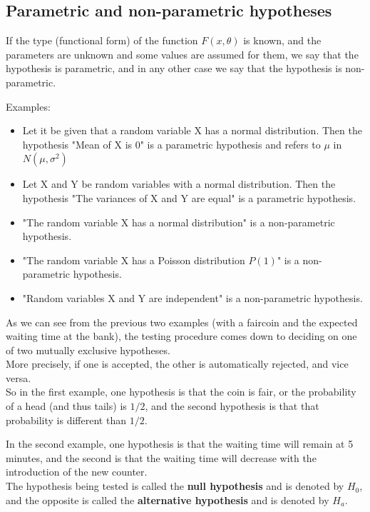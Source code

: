 \documentclass[a4paper, 12pt]{article}
\begin{document}
\subsection{Parametric and non-parametric hypotheses}

If the type (functional form) of the function $F(x,\theta)$ is known, and the parameters are unknown and some values are assumed for them, we say that the hypothesis is parametric, and in any other case we say that the hypothesis is non-parametric.

Examples:

\begin{itemize}
  \item  Let it be given that a random variable X has a normal distribution. Then the
  hypothesis "Mean of X is 0" is a parametric hypothesis and refers to $\mu$ in $N(\mu, \sigma^2)$
  \item Let X and Y be random variables with a normal distribution. Then the
  hypothesis "The variances of X and Y are equal" is a parametric hypothesis.
  \item  "The random variable X has a normal distribution" is a non-parametric
  hypothesis.
  \item  "The random variable X has a Poisson distribution $P(1)$" is a non-parametric
  hypothesis.
  \item  "Random variables X and Y are independent" is a non-parametric hypothesis.
\end{itemize}

As we can see from the previous two examples (with a faircoin and the expected waiting time at the bank), the testing procedure comes down to deciding on one of two mutually exclusive hypotheses.\\

More precisely, if one is accepted, the other is automatically rejected, and vice versa.\\

So in the first example, one hypothesis is that the coin is fair, or the probability of a head (and thus tails) is $1/2$, and the second hypothesis is that that probability is different than $1/2$.

In the second example, one hypothesis is that the waiting time will remain at 5 minutes, and the second is that the waiting time will decrease with the introduction of the new  counter.\\

The hypothesis being tested is called the \textbf{null hypothesis} and is denoted by $H_0$, and the opposite is called the \textbf{alternative hypothesis} and is denoted by $H_a$.\\
\end{document}
